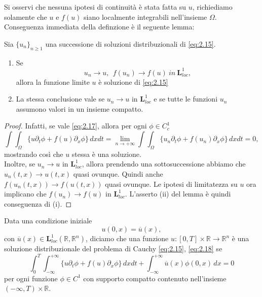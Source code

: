 Si osservi che nessuna ipotesi di continuità è stata fatta su $u$, richiediamo solamente che $u$ e $f(u)$ siano localmente integrabili nell'insieme $\Omega$.\\
Conseguenza immediata della definzione è il seguente lemma:
\begin{lemma}\label{lemma:2.3.1}
    Sia $\{u_{n}\}_{n\geq 1}$ una successione di soluzioni distribuzionali di \eqref{eq:2.15}.
        \begin{enumerate}[label=(\roman*)]
            \item Se
                \begin{equation}\label{eq:2.17}
                    u_{n}\rightarrow u, \ \ f(u_{n})\rightarrow f(u) \ in \ \mathbf{L}^{1}_{loc},
                \end{equation}
                allora la funzione limite $u$ è soluzione di \eqref{eq:2.15}
            \item La stessa conclusione vale se $u_{n}\rightarrow u$ in $\mathbf{L}^{1}_{loc}$ e se tutte le funzioni $u_{n}$ assumono valori in un insieme compatto.
        \end{enumerate}
\end{lemma}
\begin{proof}
    Infatti, se vale \eqref{eq:2.17}, allora per ogni $\phi\in C^{1}_{c}$ 
    \begin{equation*}
        \int\int_{\Omega}\{u\partial_{t}\phi+f(u)\partial_{x}\phi\}\,dx dt=\lim_{n\rightarrow +\infty}\int\int_{\Omega}\{u_{n}\partial_{t}\phi+f(u_{n})\partial_{x}\phi\}\,dx dt = 0,
    \end{equation*}
    mostrando così che $u$ stessa è una soluzione.\\
    Inoltre, se $u_{n}\rightarrow u$ in $\mathbf{L}^{1}_{loc}$, allora prendendo una sottosuccessione abbiamo che $u_{n}(t,x)\rightarrow u(t,x)$ quasi ovunque. Quindi anche $f(u_{n}(t,x))\rightarrow f(u(t,x))$ quasi ovunque. Le ipotesi di limitatezza su $u$ ora implicano che $f(u_{n})\rightarrow f(u)$ in $\mathbf{L}^{1}_{loc}$. L'asserto (ii) del lemma è quindi conseguenza di (i).
\end{proof}

\begin{definizione}
    Data una condizione iniziale
    \begin{equation}\label{eq:2.18}
        u(0,x) = \overline{u}(x),
    \end{equation}
    con $\overline{u}(x)\in\mathbf{L}^{1}_{loc}(\mathbb{R}, \mathbb{R}^{n})$, diciamo che una funzione $u\colon [0,T]\times\mathbb{R}\rightarrow\mathbb{R}^{n}$ è una soluzione distribuzionale del problema di Cauchy \eqref{eq:2.15}, \eqref{eq:2.18} se
    \begin{equation}\label{eq:2.19}
        \int_{0}^{T}\int_{-\infty}^{+\infty}\{u\partial_{t}\phi+f(u)\partial_{x}\phi\}\,dx dt +\int_{-\infty}^{+\infty}\overline{u}(x)\phi(0,x)\,dx = 0
    \end{equation}
    per ogni funzione $\phi\in C^{1}$ con supporto compatto contenuto nell'insieme $(-\infty, T)\times\mathbb{R}$. 
\end{definizione}

